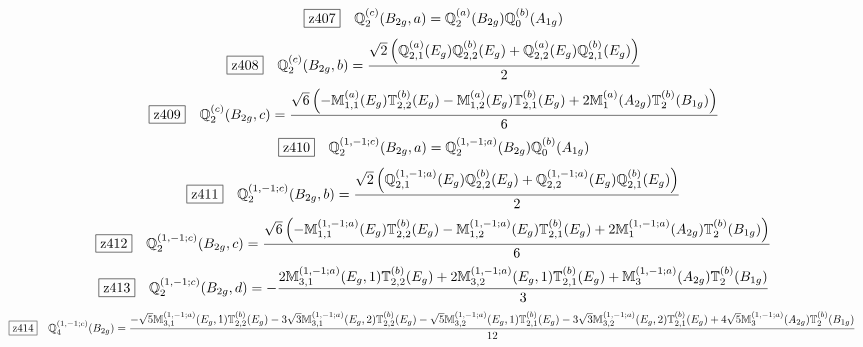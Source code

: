 \documentclass[fleqn,10pt,landscape]{jsarticle}
\begin{document}
\begin{dmath*}
\hspace*{3mm}\fbox{z407}\quad \mathbb{Q}_{2}^{(c)}(B_{2g},a)=\mathbb{Q}_{2}^{(a)}(B_{2g}) \mathbb{Q}_{0}^{(b)}(A_{1g})
\end{dmath*}
\begin{dmath*}
\hspace*{3mm}\fbox{z408}\quad \mathbb{Q}_{2}^{(c)}(B_{2g},b)=\frac{\sqrt{2} \left(\mathbb{Q}_{2,1}^{(a)}(E_{g}) \mathbb{Q}_{2,2}^{(b)}(E_{g}) + \mathbb{Q}_{2,2}^{(a)}(E_{g}) \mathbb{Q}_{2,1}^{(b)}(E_{g})\right)}{2}
\end{dmath*}
\begin{dmath*}
\hspace*{3mm}\fbox{z409}\quad \mathbb{Q}_{2}^{(c)}(B_{2g},c)=\frac{\sqrt{6} \left(- \mathbb{M}_{1,1}^{(a)}(E_{g}) \mathbb{T}_{2,2}^{(b)}(E_{g}) - \mathbb{M}_{1,2}^{(a)}(E_{g}) \mathbb{T}_{2,1}^{(b)}(E_{g}) + 2 \mathbb{M}_{1}^{(a)}(A_{2g}) \mathbb{T}_{2}^{(b)}(B_{1g})\right)}{6}
\end{dmath*}
\begin{dmath*}
\hspace*{3mm}\fbox{z410}\quad \mathbb{Q}_{2}^{(1,-1;c)}(B_{2g},a)=\mathbb{Q}_{2}^{(1,-1;a)}(B_{2g}) \mathbb{Q}_{0}^{(b)}(A_{1g})
\end{dmath*}
\begin{dmath*}
\hspace*{3mm}\fbox{z411}\quad \mathbb{Q}_{2}^{(1,-1;c)}(B_{2g},b)=\frac{\sqrt{2} \left(\mathbb{Q}_{2,1}^{(1,-1;a)}(E_{g}) \mathbb{Q}_{2,2}^{(b)}(E_{g}) + \mathbb{Q}_{2,2}^{(1,-1;a)}(E_{g}) \mathbb{Q}_{2,1}^{(b)}(E_{g})\right)}{2}
\end{dmath*}
\begin{dmath*}
\hspace*{3mm}\fbox{z412}\quad \mathbb{Q}_{2}^{(1,-1;c)}(B_{2g},c)=\frac{\sqrt{6} \left(- \mathbb{M}_{1,1}^{(1,-1;a)}(E_{g}) \mathbb{T}_{2,2}^{(b)}(E_{g}) - \mathbb{M}_{1,2}^{(1,-1;a)}(E_{g}) \mathbb{T}_{2,1}^{(b)}(E_{g}) + 2 \mathbb{M}_{1}^{(1,-1;a)}(A_{2g}) \mathbb{T}_{2}^{(b)}(B_{1g})\right)}{6}
\end{dmath*}
\begin{dmath*}
\hspace*{3mm}\fbox{z413}\quad \mathbb{Q}_{2}^{(1,-1;c)}(B_{2g},d)=- \frac{2 \mathbb{M}_{3,1}^{(1,-1;a)}(E_{g},1) \mathbb{T}_{2,2}^{(b)}(E_{g}) + 2 \mathbb{M}_{3,2}^{(1,-1;a)}(E_{g},1) \mathbb{T}_{2,1}^{(b)}(E_{g}) + \mathbb{M}_{3}^{(1,-1;a)}(A_{2g}) \mathbb{T}_{2}^{(b)}(B_{1g})}{3}
\end{dmath*}
\begin{dmath*}
\hspace*{3mm}\fbox{z414}\quad \mathbb{Q}_{4}^{(1,-1;c)}(B_{2g})=\frac{- \sqrt{5} \mathbb{M}_{3,1}^{(1,-1;a)}(E_{g},1) \mathbb{T}_{2,2}^{(b)}(E_{g}) - 3 \sqrt{3} \mathbb{M}_{3,1}^{(1,-1;a)}(E_{g},2) \mathbb{T}_{2,2}^{(b)}(E_{g}) - \sqrt{5} \mathbb{M}_{3,2}^{(1,-1;a)}(E_{g},1) \mathbb{T}_{2,1}^{(b)}(E_{g}) - 3 \sqrt{3} \mathbb{M}_{3,2}^{(1,-1;a)}(E_{g},2) \mathbb{T}_{2,1}^{(b)}(E_{g}) + 4 \sqrt{5} \mathbb{M}_{3}^{(1,-1;a)}(A_{2g}) \mathbb{T}_{2}^{(b)}(B_{1g})}{12}
\end{dmath*}
\end{document}
